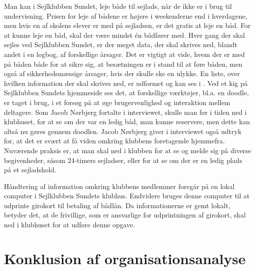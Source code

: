 Man kan i Sejlklubben Sundet, leje både til sejlads, når de ikke er i brug til undervisning. 
Prisen for leje af bådene er højere i weekenderne end i hverdagene, men hvis en af skolens elever er med på sejladsen, er det gratis at leje en båd. 
For at kunne leje en båd, skal der være mindst én bådfører med.
Hver gang der skal sejles ved Sejlklubben Sundet, er der meget data, der skal skrives ned, blandt andet i en logbog, af forskellige årsager. 
Det er vigtigt at vide, hvem der er med på båden både for at sikre sig, at besætningen er i stand til at føre båden, men også af sikkerhedsmæssige årsager, hvis der skulle ske en ulykke. 
En liste, over hvilken information der skal skrives ned, er udformet og kan ses i . 
Ved et kig på Sejlklubben Sundets hjemmeside \citep{SundetUdlaan} ses det, at forskellige værktøjer, bl.a. en doodle, er taget i brug, i et forsøg på at øge brugervenlighed og interaktion mellem deltagere. 
Som Jacob Nørbjerg fortalte i interviewet, skulle man før i tiden ned i klubhuset, for at se om der var en ledig båd, man kunne reservere, men dette kan altså nu gøres gennem doodlen. 
Jacob Nørbjerg giver i interviewet også udtryk for, at det er svært at få viden omkring klubbens foretagende hjemmefra. 
Nuværende praksis er, at man skal ned i klubben for at se og melde sig på diverse begivenheder, såsom 24-timers sejladser, eller for at se om der er en ledig plads på et sejladshold.

Håndtering af information omkring klubbens medlemmer foregår på en lokal computer i Sejlklubben Sundets klubhus. 
Endvidere bruges denne computer til at udprinte girokort til betaling af bådlån. 
Da informationerne er gemt lokalt, betyder det, at de frivillige, som er ansvarlige for udprintningen af girokort, skal ned i klubhuset for at udføre denne opgave.


\section{Konklusion af organisationsanalyse}\label{sec:organisation-konklusion}

